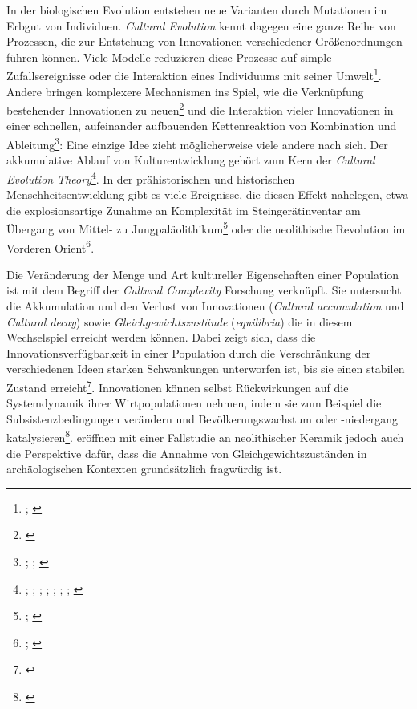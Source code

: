\documentclass[openany,twoside,twocolumn]{book}
\let\rmarkdownfootnote\footnote%
\def\footnote{\protect\rmarkdownfootnote}
\begin{document}
In der biologischen Evolution entstehen neue Varianten durch Mutationen im Erbgut von Individuen. \emph{Cultural Evolution} kennt dagegen eine ganze Reihe von Prozessen, die zur Entstehung von Innovationen verschiedener Größenordnungen führen können. Viele Modelle reduzieren diese Prozesse auf simple Zufallsereignisse oder die Interaktion eines Individuums mit seiner Umwelt\footnote{\textcite{henrich_evolution_2003}; \textcite{rendell_why_2010}}. Andere bringen komplexere Mechanismen ins Spiel, wie die Verknüpfung bestehender Innovationen zu neuen\footnote{\textcite{enquist_why_2008}} und die Interaktion vieler Innovationen in einer schnellen, aufeinander aufbauenden Kettenreaktion von Kombination und Ableitung\footnote{\textcite{fogarty_cultural_2015}; \textcite{kolodny_evolution_2015}; \textcite{kolodny_game-changing_2016}}: Eine einzige Idee zieht möglicherweise viele andere nach sich. Der akkumulative Ablauf von Kulturentwicklung gehört zum Kern der \emph{Cultural Evolution Theory}\footnote{\textcite{basalla_evolution_1988}; \textcite{boyd_culture_1985}; \textcite{boyd_evolutionary_1988}; \textcite{cavalli-sforza_cultural_1981}; \textcite{durham_adaptive_1976}; \textcite{feldman_gene-culture_1996}; \textcite{henrich_evolution_2003}; \textcite{lumsden_genes_1981}}. In der prähistorischen und historischen Menschheitsentwicklung gibt es viele Ereignisse, die diesen Effekt nahelegen, etwa die explosionsartige Zunahme an Komplexität im Steingerätinventar am Übergang von Mittel- zu Jungpaläolithikum\footnote{\textcite{bar-yosef_nature_1998}; \textcite{roebroeks_time_2008}} oder die neolithische Revolution im Vorderen Orient\footnote{\textcite{gopher_when_2001}; \textcite{veen_agricultural_2010}}.

Die Veränderung der Menge und Art kultureller Eigenschaften einer Population ist mit dem Begriff der \emph{Cultural Complexity} Forschung verknüpft. Sie untersucht die Akkumulation und den Verlust von Innovationen (\emph{Cultural accumulation} und \emph{Cultural decay}) sowie \emph{Gleichgewichtszustände} (\emph{equilibria}) die in diesem Wechselspiel erreicht werden können. Dabei zeigt sich, dass die Innovationsverfügbarkeit in einer Population durch die Verschränkung der verschiedenen Ideen starken Schwankungen unterworfen ist, bis sie einen stabilen Zustand erreicht\footnote{\textcite{kolodny_evolution_2015}}. Innovationen können selbst Rückwirkungen auf die Systemdynamik ihrer Wirtpopulationen nehmen, indem sie zum Beispiel die Subsistenzbedingungen verändern und Bevölkerungswachstum oder -niedergang katalysieren\footnote{\textcite{kolodny_game-changing_2016}}. \textcite{crema_revealing_2016} eröffnen mit einer Fallstudie an neolithischer Keramik jedoch auch die Perspektive dafür, dass die Annahme von Gleichgewichtszuständen in archäologischen Kontexten grundsätzlich fragwürdig ist.
\end{document}
